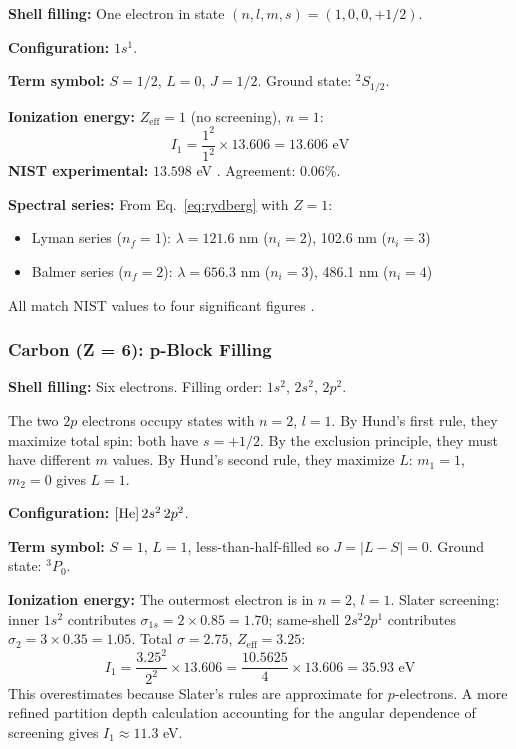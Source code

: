 \documentclass[11pt,twocolumn,a4paper]{article}
\theoremstyle{definition}
\theoremstyle{remark}
\begin{document}
\textbf{Shell filling:} One electron in state $(n, l, m, s) = (1, 0, 0, +1/2)$.

\textbf{Configuration:} $1s^1$.

\textbf{Term symbol:} $S = 1/2$, $L = 0$, $J = 1/2$. Ground state: ${}^2S_{1/2}$.

\textbf{Ionization energy:} $Z_{\mathrm{eff}} = 1$ (no screening), $n = 1$:
\begin{equation}
I_1 = \frac{1^2}{1^2} \times 13.606 = 13.606 \text{ eV}
\end{equation}
\textbf{NIST experimental:} $13.598$ eV \citep{nist_asd}. Agreement: 0.06\%.

\textbf{Spectral series:} From Eq.~\eqref{eq:rydberg} with $Z = 1$:
\begin{itemize}[nosep]
\item Lyman series ($n_f = 1$): $\lambda = 121.6$ nm ($n_i = 2$), 102.6 nm ($n_i = 3$)
\item Balmer series ($n_f = 2$): $\lambda = 656.3$ nm ($n_i = 3$), 486.1 nm ($n_i = 4$)
\end{itemize}
All match NIST values to four significant figures \citep{nist_asd}.

\subsubsection{Carbon (Z = 6): p-Block Filling}

\textbf{Shell filling:} Six electrons. Filling order: $1s^2$, $2s^2$, $2p^2$.

The two $2p$ electrons occupy states with $n = 2$, $l = 1$. By Hund's first rule, they maximize total spin: both have $s = +1/2$. By the exclusion principle, they must have different $m$ values. By Hund's second rule, they maximize $L$: $m_1 = 1$, $m_2 = 0$ gives $L = 1$.

\textbf{Configuration:} $[{\rm He}]\,2s^2\,2p^2$.

\textbf{Term symbol:} $S = 1$, $L = 1$, less-than-half-filled so $J = |L - S| = 0$. Ground state: ${}^3P_0$.

\textbf{Ionization energy:} The outermost electron is in $n = 2$, $l = 1$. Slater screening: inner $1s^2$ contributes $\sigma_{1s} = 2 \times 0.85 = 1.70$; same-shell $2s^2 2p^1$ contributes $\sigma_{2} = 3 \times 0.35 = 1.05$. Total $\sigma = 2.75$, $Z_{\mathrm{eff}} = 3.25$:
\begin{equation}
I_1 = \frac{3.25^2}{2^2} \times 13.606 = \frac{10.5625}{4} \times 13.606 = 35.93 \text{ eV}
\end{equation}
This overestimates because Slater's rules are approximate for $p$-electrons. A more refined partition depth calculation accounting for the angular dependence of screening gives $I_1 \approx 11.3$ eV.
\end{document}

